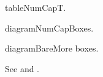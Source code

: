 \begin{flmFloat}{table}{NumCap}T.\caption{A table}\flmLabels{\label{ref1}}\end{flmFloat}

\begin{flmFloat}{diagram}{NumCap}Boxes.\caption{Arrows}\flmLabels{\label{ref2}}\end{flmFloat}

\begin{flmFloat}{diagram}{Bare}More boxes.\end{flmFloat}

See  and .
\RequirePackage{caption}
\RequirePackage{zref-clever}
\providecommand\flmFloatPlacementArgsNumCap{[tbph]}
\providecommand\flmFloatPlacementArgsNumOnly{[tbph]}
\providecommand\flmFloatPlacementArgsCapOnly{[h]}
\providecommand\flmFloatPlacementArgsBare{[h]}
\def\flm@float@infloat#1#2{\edef\flm@float@begin{\noexpand\begin{#1}#2}\def\flm@float@end{\end{#1}}}
\def\flm@float@incenter#1{\def\flm@float@begin{\begin{center}\def\@captype{#1}}\def\flm@float@end{\end{center}}}
